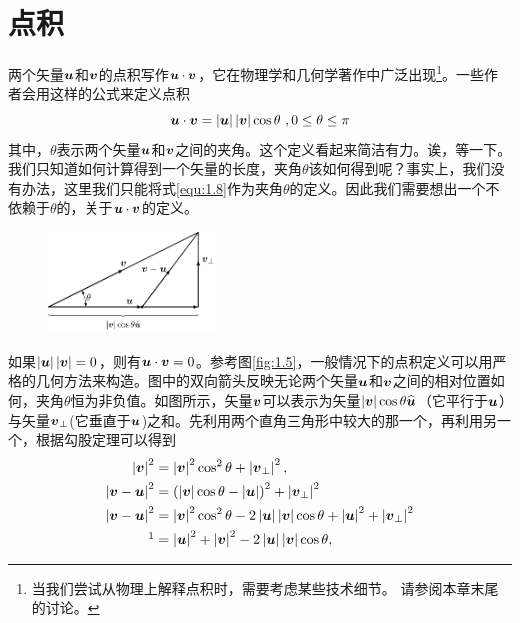 \section{点积}
两个矢量$\boldsymbol{u}$和$\boldsymbol{v}$的点积写作$\boldsymbol{u}\cdot \boldsymbol{v}$，它在物理学和几何学著作中广泛出现\footnote{当我们尝试从物理上解释点积时，需要考虑某些技术细节。 请参阅本章末尾的讨论。}。一些作者会用这样的公式来定义点积
\begin{equation}
    \boldsymbol{u}\cdot \boldsymbol{v}=\left| \boldsymbol{u} \right|\left| \boldsymbol{v} \right|\cos \theta \,\, ,  0\le \theta \le \pi \label{equ:1.8} 
\end{equation}
其中，$\theta$表示两个矢量$\boldsymbol{u}$和$\boldsymbol{v}$之间的夹角。这个定义看起来简洁有力。诶，等一下。我们只知道如何计算得到一个矢量的长度，夹角$\theta $该如何得到呢？事实上，我们没有办法，这里我们只能将式\eqref{equ:1.8}作为夹角$\theta $的定义。因此我们需要想出一个不依赖于$\theta$的，关于$\boldsymbol{u}\cdot \boldsymbol{v}$的定义。

\begin{figure}[htbp]
	\centering
	\includegraphics[width=0.4\textwidth]{./image/1.5.pdf}
	\caption{}
	\label{fig:1.5}
\end{figure}

如果$\left| \boldsymbol{u} \right|\left| \boldsymbol{v} \right| = 0$，则有$\boldsymbol{u}\cdot \boldsymbol{v}=0$。参考图\eqref{fig:1.5}，一般情况下的点积定义可以用严格的几何方法来构造。图中的双向箭头反映无论两个矢量$\boldsymbol{u}$和$\boldsymbol{v}$之间的相对位置如何，夹角$\theta $恒为非负值。如图所示，矢量$\boldsymbol{v}$可以表示为矢量$\left| \boldsymbol{v} \right|\cos \theta \widehat{\boldsymbol{u}}$（它平行于$\boldsymbol{u}$）与矢量$\boldsymbol{v}_{\bot}$(它垂直于$\boldsymbol{u}$)之和。先利用两个直角三角形中较大的那一个，再利用另一个，根据勾股定理可以得到
\begin{align}
	\left| \bb{v} \right|^2&=\left| \bb{v} \right|^2\cos ^2\theta +\left| \bb{v}_{\bot} \right|^2,\label{equ:1.9}\\
	\left| \bb{v}-\bb{u} \right|^2&=\left( \left| \bb{v} \right|\cos \theta -\left| \bb{u} \right| \right) ^2+\left| \bb{v}_{\bot} \right|^2\nonumber\\
	\left| \bb{v}-\bb{u} \right|^2&=\left| \bb{v} \right|^2\cos ^2\theta -2\left| \bb{u} \right|\left| \bb{v} \right|\cos \theta +\left| \bb{u} \right|^2+\left| \bb{v}_{\bot} \right|^2\nonumber\\
	\footnotemark&=\left| \bb{u} \right|^2+\left| \bb{v} \right|^2-2\left| \bb{u} \right|\left| \bb{v} \right|\cos \theta \label{equ:1.10},
\end{align}

